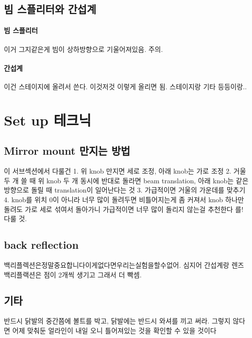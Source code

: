 \subsection{빔 스플리터와 간섭계}
\paragraph{빔 스플리터}
이거 그지같은게 빔이 상하방향으로 기울어져있음. 주의.
\paragraph{간섭계}
이건 스테이지에 올려서 쓴다. 이것저것 이렇게 올리면 됨. 스테이지랑 기타 등등이랑..

\section{Set up 테크닉}
\subsection{Mirror mount 만지는 방법}
이 서브섹션에서 다룰건 1. 위 knob 만지면 세로 조정, 아래 knob는 가로 조정 2. 거울 두 개 쓸 때 위 knob 두 개 동시에 반대로 돌라면 beam translation, 아래 knob는 같은 방향으로 돌릴 때 translation이 일어난다는 것 3. 가급적이면 거울의 가운데를 맞추기 4. knob를 위치 0이 아니라 너무 많이 돌려두면 비틀어지는게 좀 커져서 knob 하나만 돌려도 가로 세로 섞여서 돌아가니 가급적이면 너무 많이 돌리지 않는걸 추천한다 를! 다룰 것.
\subsection{back reflection}
백리플렉션은정말중요합니다이게없다면우리는실험을할수없어. 심지어 간섭계랑 렌즈 백리플랙션은 점이 2개씩 생기고 그래서 더 빡셈.
\subsection{기타}
반드시 닭발의 중간쯤에 볼트를 박고, 닭발에는 반드시 와셔를 끼고 써라. 그렇지 않다면 어제 맞춰둔 얼라인이 내일 오니 틀어져있는 것을 확인할 수 있을 것이다